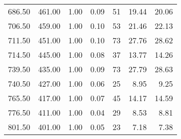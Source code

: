 \begin{table}
\begin{tabular}{rrrrrrr}
686.50 & 461.00 & 1.00 & 0.09 & 51 & 19.44 & 20.06 \\
706.50 & 459.00 & 1.00 & 0.10 & 53 & 21.46 & 22.13 \\
711.50 & 451.00 & 1.00 & 0.10 & 73 & 27.76 & 28.62 \\
714.50 & 445.00 & 1.00 & 0.08 & 37 & 13.77 & 14.26 \\
739.50 & 435.00 & 1.00 & 0.09 & 73 & 27.79 & 28.63 \\
740.50 & 427.00 & 1.00 & 0.06 & 25 & 8.95 & 9.25 \\
765.50 & 417.00 & 1.00 & 0.07 & 45 & 14.17 & 14.59 \\
776.50 & 411.00 & 1.00 & 0.04 & 29 & 8.53 & 8.81 \\
801.50 & 401.00 & 1.00 & 0.05 & 23 & 7.18 & 7.38 \\
\bottomrule
\end{tabular}
\end{table}
